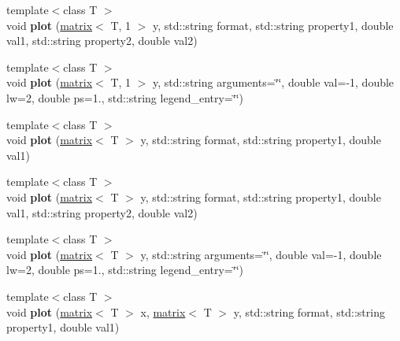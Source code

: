 \begin{DoxyCompactItemize}
\item 
\hypertarget{classkeycpp_1_1_figure_a699f1514e3480e10304d5fc90c4ba43a}{{\footnotesize template$<$class T $>$ }\\void {\bfseries plot} (\hyperlink{classkeycpp_1_1matrix}{matrix}$<$ T, 1 $>$ y, std\-::string format, std\-::string property1, double val1, std\-::string property2, double val2)}\label{classkeycpp_1_1_figure_a699f1514e3480e10304d5fc90c4ba43a}

\item 
\hypertarget{classkeycpp_1_1_figure_a1850a24b9d1f6cccc0dd759822344ba8}{{\footnotesize template$<$class T $>$ }\\void {\bfseries plot} (\hyperlink{classkeycpp_1_1matrix}{matrix}$<$ T, 1 $>$ y, std\-::string arguments=\char`\"{}\char`\"{}, double val=-\/1, double lw=2, double ps=1., std\-::string legend\-\_\-entry=\char`\"{}\char`\"{})}\label{classkeycpp_1_1_figure_a1850a24b9d1f6cccc0dd759822344ba8}

\item 
\hypertarget{classkeycpp_1_1_figure_a88e55b3a2c1b05c7c7fe2e6785e11f58}{{\footnotesize template$<$class T $>$ }\\void {\bfseries plot} (\hyperlink{classkeycpp_1_1matrix}{matrix}$<$ T $>$ y, std\-::string format, std\-::string property1, double val1)}\label{classkeycpp_1_1_figure_a88e55b3a2c1b05c7c7fe2e6785e11f58}

\item 
\hypertarget{classkeycpp_1_1_figure_a2e6daf7811c3d34fabb83bc8368e1e7c}{{\footnotesize template$<$class T $>$ }\\void {\bfseries plot} (\hyperlink{classkeycpp_1_1matrix}{matrix}$<$ T $>$ y, std\-::string format, std\-::string property1, double val1, std\-::string property2, double val2)}\label{classkeycpp_1_1_figure_a2e6daf7811c3d34fabb83bc8368e1e7c}

\item 
\hypertarget{classkeycpp_1_1_figure_a39dd5e2d5e6acb6db99ac75476ea777a}{{\footnotesize template$<$class T $>$ }\\void {\bfseries plot} (\hyperlink{classkeycpp_1_1matrix}{matrix}$<$ T $>$ y, std\-::string arguments=\char`\"{}\char`\"{}, double val=-\/1, double lw=2, double ps=1., std\-::string legend\-\_\-entry=\char`\"{}\char`\"{})}\label{classkeycpp_1_1_figure_a39dd5e2d5e6acb6db99ac75476ea777a}

\item 
\hypertarget{classkeycpp_1_1_figure_a35987b305f55c3b8c612fbaec2223060}{{\footnotesize template$<$class T $>$ }\\void {\bfseries plot} (\hyperlink{classkeycpp_1_1matrix}{matrix}$<$ T $>$ x, \hyperlink{classkeycpp_1_1matrix}{matrix}$<$ T $>$ y, std\-::string format, std\-::string property1, double val1)}\label{classkeycpp_1_1_figure_a35987b305f55c3b8c612fbaec2223060}


\end{DoxyCompactItemize}
